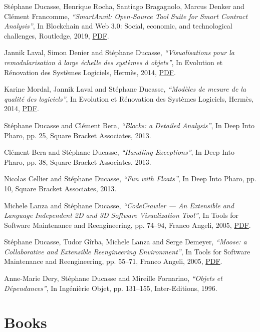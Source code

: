 \documentclass{article}
\newcommand{\czauthors}[1]{#1}
\newcommand{\cztitle}[1]{\emph{``#1''}}
\newcommand{\czbooktitle}[1]{#1}
\begin{document}
\begin{itemize}

	\pub  \czauthors{St\'ephane Ducasse, Henrique Rocha, Santiago Bragagnolo, Marcus Denker and Cl\'ement Francomme},  \cztitle{SmartAnvil: Open-Source Tool Suite for Smart Contract Analysis},  In \czbooktitle{Blockchain and Web 3.0: Social, economic, and technological challenges}, Routledge, 2019, \href{http://rmod-files.lille.inria.fr/Team/Texts/Papers/Duca18a-BookChapter-SmartAnvil.pdf}{PDF}.

	\pub  \czauthors{Jannik Laval, Simon Denier and St\'ephane Ducasse},  \cztitle{Visualisations pour la remodularisation \`a large \'echelle des syst\`emes \`a objets},  In \czbooktitle{Evolution et R\'enovation des Syst\`emes Logiciels}, Herm\`es, 2014, \href{http://rmod-files.lille.inria.fr/Team/Texts/Papers/Lava14a-Chapitresvisu.pdf}{PDF}.

	\pub  \czauthors{Karine Mordal, Jannik Laval and St\'ephane Ducasse},  \cztitle{Mod\`eles de mesure de la qualit\'e des logiciels},  In \czbooktitle{Evolution et R\'enovation des Syst\`emes Logiciels}, Herm\`es, 2014, \href{http://rmod-files.lille.inria.fr/Team/Texts/Papers/Mord14a-Chapitrequalite.pdf}{PDF}.

	\pub  \czauthors{St\'ephane Ducasse and Cl\'ement Bera},  \cztitle{Blocks: a Detailed Analysis},  In \czbooktitle{Deep Into Pharo}, pp. 25, Square Bracket Associates, 2013.

	\pub  \czauthors{Cl\'ement Bera and St\'ephane Ducasse},  \cztitle{Handling Exceptions},  In \czbooktitle{Deep Into Pharo}, pp. 38, Square Bracket Associates, 2013.

	\pub  \czauthors{Nicolas Cellier and St\'ephane Ducasse},  \cztitle{Fun with Floats},  In \czbooktitle{Deep Into Pharo}, pp. 10, Square Bracket Associates, 2013.

	\pub  \czauthors{Michele Lanza and St\'ephane Ducasse},  \cztitle{CodeCrawler --- An Extensible and Language Independent 2D and 3D Software Visualization Tool},  In \czbooktitle{Tools for Software Maintenance and Reengineering}, pp. 74--94, Franco Angeli, 2005, \href{http://rmod-files.lille.inria.fr/Team/Texts/Papers/Lanz05bCCBookChapter.pdf}{PDF}.

	\pub  \czauthors{St\'ephane Ducasse, Tudor G\^irba, Michele Lanza and Serge Demeyer},  \cztitle{Moose: a Collaborative and Extensible Reengineering Environment},  In \czbooktitle{Tools for Software Maintenance and Reengineering}, pp. 55--71, Franco Angeli, 2005, \href{http://rmod-files.lille.inria.fr/Team/Texts/Papers/Duca05aMooseBookChapter.pdf}{PDF}.

	\pub  \czauthors{Anne-Marie Dery, St\'ephane Ducasse and Mireille Fornarino},  \cztitle{Objets et D\'ependances},  In \czbooktitle{Ing\'eni\`erie Objet}, pp. 131--155, Inter-Editions, 1996.

\end{itemize}\section{Books}
\end{document}
